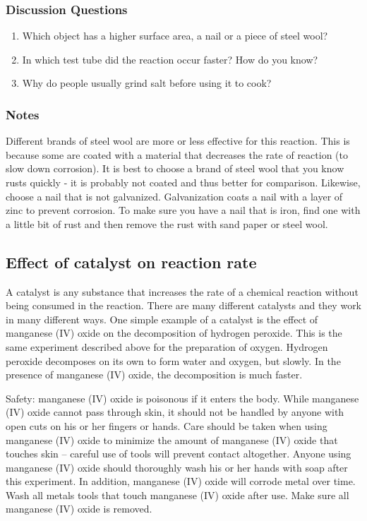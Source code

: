 \subsubsection*{Discussion Questions}
\begin{enumerate}
\item{Which object has a higher surface area, a nail or a piece of steel wool?}
\item{In which test tube did the reaction occur faster? How do you know?}
\item{Why do people usually grind salt before using it to cook?}
\end{enumerate}

\subsubsection*{Notes}
Different brands of steel wool are more or less effective for this reaction. This is because some are coated with a material that decreases the rate of reaction (to slow down corrosion). It is best to choose a brand of steel wool that you know rusts quickly - it is probably not coated and thus better for comparison. Likewise, choose a nail that is not galvanized. Galvanization coats a nail with a layer of zinc to prevent corrosion. To make sure you have a nail that is iron, find one with a little bit of rust and then remove the rust with sand paper or steel wool.

\subsection{Effect of catalyst on reaction rate}

A catalyst is any substance that increases the rate of a chemical reaction without being consumed in the reaction. There are many different catalysts and they work in many different ways. One simple example of a catalyst is the effect of manganese (IV) oxide on the decomposition of hydrogen peroxide. This is the same experiment described above for the preparation of oxygen. Hydrogen peroxide decomposes on its own to form water and oxygen, but slowly. In the presence of manganese (IV) oxide, the decomposition is much faster.

Safety: manganese (IV) oxide is poisonous if it enters the body. While manganese (IV) oxide cannot pass through skin, it should not be handled by anyone with open cuts on his or her fingers or hands. Care should be taken when using manganese (IV) oxide to minimize the amount of manganese (IV) oxide that touches skin – careful use of tools will prevent contact altogether. Anyone using manganese (IV) oxide should thoroughly wash his or her hands with soap after this experiment. In addition, manganese (IV) oxide will corrode metal over time. Wash all metals tools that touch manganese (IV) oxide after use. Make sure all manganese (IV) oxide is removed.

